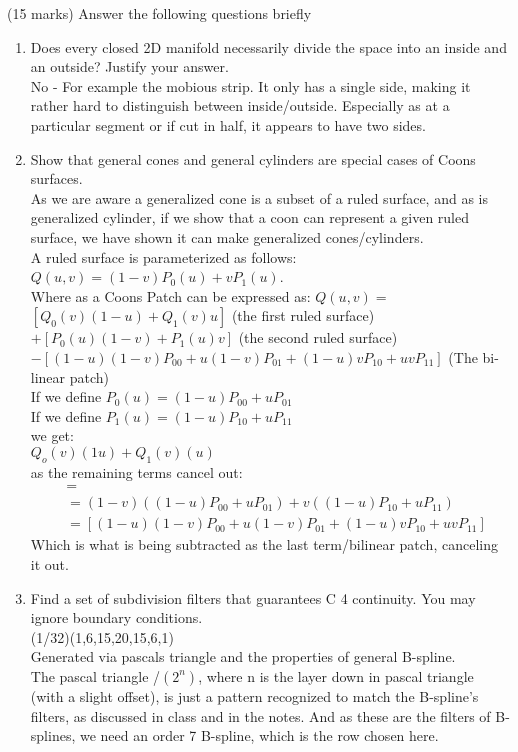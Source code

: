 (15 marks) Answer the following questions briefly
\begin{enumerate}
\item Does every closed 2D manifold necessarily divide the space into an inside and an outside? Justify your answer. \\
No - For example the mobious strip. It only has a single side, making it rather hard to distinguish between inside/outside. Especially as at a particular segment or if cut in half, it appears to have two sides.\\

\item Show that general cones and general cylinders are special cases of Coons surfaces. \\
As we are aware a generalized cone is a subset of a ruled surface, and as is generalized cylinder, if we show that a coon can represent a given ruled surface, we have shown it can make generalized cones/cylinders. \\

A ruled surface is parameterized as follows: $Q(u,v) = (1 - v)P_0(u) + vP_1(u)$. \\
Where as a Coons Patch can be expressed as: $Q(u, v) =$ \\
$[Q_0 (v)(1 - u) + Q_1 (v)u]$ (the first ruled surface) \\
$+ [P_0 (u)(1 - v) + P_1 (u)v]$ (the second ruled surface) \\
$- [(1 - u)(1 - v)P_{00} + u(1 - v)P_{01} + (1 - u)vP_{10} + uvP_{11} ]$ (The bi-linear patch) \\

If we define $P_0(u) = (1-u)P_{00} + uP_{01}$ \\
If we define $P_1(u) = (1-u)P_{10} + uP_{11}$ \\
we get: \\
$Q_o(v)(1u) + Q_1(v)(u)$ \\
as the remaining terms cancel out:
\begin{align*}
[P_0 (u)(1 - v) + P_1 (u)v] &= \\
&= (1-v)((1-u)P_{00} + uP_{01}) + v((1-u)P_{10} + uP_{11}) \\
&= [(1 - u)(1 - v)P_{00} + u(1 - v)P_{01} + (1 - u)vP_{10} + uvP_{11} ]
\end{align*}
Which is what is being subtracted as the last term/bilinear patch, canceling it out.

\item Find a set of subdivision filters that guarantees C 4 continuity. You may ignore boundary
conditions. \\
(1/32)(1,6,15,20,15,6,1) \\
Generated via pascals triangle and the properties of general B-spline. \\
The pascal triangle /$(2^n)$, where n is the layer down in pascal triangle (with a slight offset), is just a pattern recognized to match the B-spline's filters, as discussed in class and in the notes. And as these are the filters of B-splines, we need an order 7 B-spline, which is the row chosen here.
\end{enumerate}

